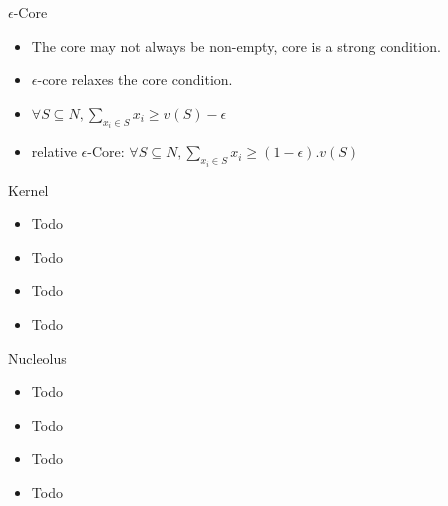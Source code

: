 \documentclass{beamer}
\begin{document}
\begin{frame}{$\epsilon$-Core}
    \begin{itemize}
        \item The core may not always be non-empty, core is a strong condition.
        \item $\epsilon$-core relaxes the core condition.
        \item $\forall S \subseteq N, \sum_{x_i \in S} x_i \geq v(S) - \epsilon$
        \item relative $\epsilon$-Core: $\forall S \subseteq N, \sum_{x_i \in S} x_i \geq (1-\epsilon).v(S)$
    \end{itemize}
\end{frame}

\begin{frame}{Kernel}
    \begin{itemize}
        \item Todo
        \item Todo
        \item Todo
        \item Todo
    \end{itemize}
\end{frame}

\begin{frame}{Nucleolus}
    \begin{itemize}
        \item Todo
        \item Todo
        \item Todo
        \item Todo
    \end{itemize}
\end{frame}
\end{document}

